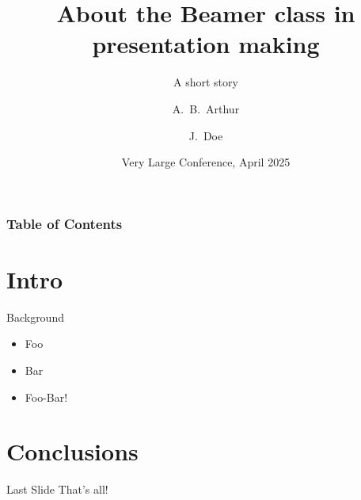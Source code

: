 \documentclass[aspectratio=169]{beamer}
\title[Beamer example] %
{About the Beamer class in presentation making}
\subtitle{A short story}
\author[Arthur, Doe] %
{A.~B.~Arthur\inst{1} \and J.~Doe\inst{2}}
\institute[VFU] %
{
  \inst{1}%
  Department of Computer Science\\
  Tufts University
  \and
  \inst{2}%
  Department of Engineering\\
  Very Famous University
}
\date[VLC 2025] %
{Very Large Conference, April 2025}
\begin{document}
\begin{frame}
  \titlepage
\end{frame}

\begin{frame}
\frametitle{Table of Contents}
\tableofcontents
\end{frame}

\section{Intro}
\begin{frame}{Background}
  \begin{itemize}
    \item Foo
    \item Bar
    \item Foo-Bar!
  \end{itemize}
\end{frame}

\section{Conclusions}

\begin{frame}{Last Slide}
  That's all!
\end{frame}
\end{document}
